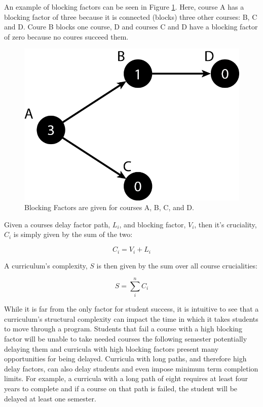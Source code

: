 \documentclass[botnum, fleqn]{unmeethesis}
\begin{document}
An example of blocking factors can be seen in Figure \ref{fig:blocking_factor_example}. Here, course A has a blocking factor of three because it is connected (blocks) three other courses: B, C and D. Coure B blocks one course, D and courses C and D have a blocking factor of zero because no coures succeed them.

\begin{figure}[h!]
\centerline{\includegraphics[scale=0.4]{./figures/blocking_factor.png}}
\caption{Blocking Factors are given for courses A, B, C, and D.} 
\label{fig:blocking_factor_example}
\end{figure}

Given a courses delay factor path, \(L_i\), and blocking factor, \(V_i\), then it's cruciality, \(C_i\) is simply given by the sum of the two:

\begin{equation}
  C_{i} = V_{i} + L_{i}
\end{equation}

A curriculum's complexity, \(S\) is then given by the sum over all course crucialities:

\begin{equation}
  S = \sum_{i}^n C_{i}
\end{equation}

While it is far from the only factor for student success, it is intuitive to see that a curriculum's structural complexity can impact the time in which it takes students to move through a program. Students that fail a course with a high blocking factor will be unable to take needed courses the following semester potentially delaying them and curricula with high blocking factors present many opportunities for being delayed. Curricula with long paths, and therefore high delay factors, can also delay students and even impose minimum term completion limits. For example, a curricula with a long path of eight requires at least four years to complete and if a course on that path is failed, the student will be delayed at least one semester.
\end{document}
